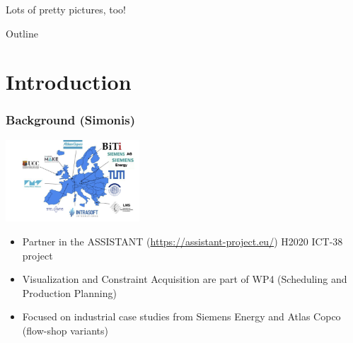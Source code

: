 \documentclass[dvipsnames,aspectratio=169]{beamer}
\begin{document}
\begin{frame}{Lots of pretty pictures, too!}

\end{frame}

\begin{frame}{Outline}
    \tableofcontents
\end{frame}

\section{Introduction}

\begin{frame}
\frametitle{Background (Simonis)}
\includegraphics[width=5cm]{images/assistantpartners}
\begin{itemize}
\item Partner in the ASSISTANT (\url{https://assistant-project.eu/}) H2020 ICT-38 project
\item Visualization and Constraint Acquisition are part of WP4 (Scheduling and Production Planning)
\item Focused on industrial case studies from Siemens Energy and Atlas Copco (flow-shop variants)
\end{itemize}
\end{frame}
\end{document}

